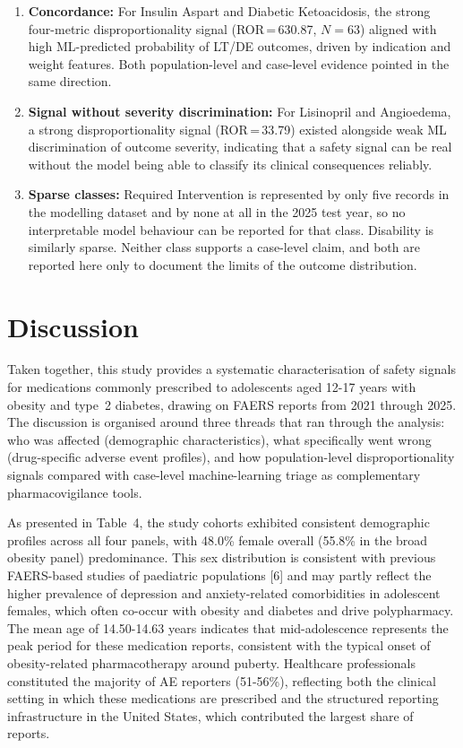 \documentclass[10pt,a4paper]{article}
\begin{document}
\begin{enumerate}[noitemsep]
\item \textbf{Concordance:} For Insulin Aspart and Diabetic Ketoacidosis, the strong four-metric disproportionality signal (ROR\,=\,630.87, $N=63$) aligned with high ML-predicted probability of LT/DE outcomes, driven by indication and weight features. Both population-level and case-level evidence pointed in the same direction.
\item \textbf{Signal without severity discrimination:} For Lisinopril and Angioedema, a strong disproportionality signal (ROR\,=\,33.79) existed alongside weak ML discrimination of outcome severity, indicating that a safety signal can be real without the model being able to classify its clinical consequences reliably.
\item \textbf{Sparse classes:} Required Intervention is represented by only five records in the modelling dataset and by none at all in the 2025 test year, so no interpretable model behaviour can be reported for that class. Disability is similarly sparse. Neither class supports a case-level claim, and both are reported here only to document the limits of the outcome distribution.
\end{enumerate}


\section{Discussion}

Taken together, this study provides a systematic characterisation of safety signals for medications commonly prescribed to adolescents aged 12-17 years with obesity and type~2 diabetes, drawing on FAERS reports from 2021 through 2025. The discussion is organised around three threads that ran through the analysis: who was affected (demographic characteristics), what specifically went wrong (drug-specific adverse event profiles), and how population-level disproportionality signals compared with case-level machine-learning triage as complementary pharmacovigilance tools.

As presented in Table~4, the study cohorts exhibited consistent demographic profiles across all four panels, with 48.0\% female overall (55.8\% in the broad obesity panel) predominance. This sex distribution is consistent with previous FAERS-based studies of paediatric populations [6] and may partly reflect the higher prevalence of depression and anxiety-related comorbidities in adolescent females, which often co-occur with obesity and diabetes and drive polypharmacy. The mean age of 14.50-14.63 years indicates that mid-adolescence represents the peak period for these medication reports, consistent with the typical onset of obesity-related pharmacotherapy around puberty. Healthcare professionals constituted the majority of AE reporters (51-56\%), reflecting both the clinical setting in which these medications are prescribed and the structured reporting infrastructure in the United States, which contributed the largest share of reports.
\end{document}
